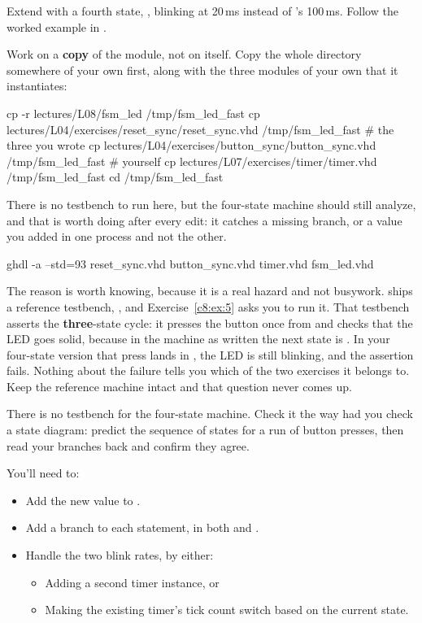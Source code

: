 \label{c8:ex:3}
Extend  with a fourth state, , blinking at 20\,ms instead of
's 100\,ms. Follow the worked example in .

Work on a \textbf{copy} of the module, not on  itself. Copy
the whole directory somewhere of your own first, along with the three modules of your own that it
instantiates:

\begin{shell}
cp -r lectures/L08/fsm_led /tmp/fsm_led_fast
cp lectures/L04/exercises/reset_sync/reset_sync.vhd /tmp/fsm_led_fast     # the three you wrote
cp lectures/L04/exercises/button_sync/button_sync.vhd /tmp/fsm_led_fast   # yourself
cp lectures/L07/exercises/timer/timer.vhd /tmp/fsm_led_fast
cd /tmp/fsm_led_fast
\end{shell}

\noindent There is no testbench to run here, but the four-state machine should still analyze, and
that is worth doing after every edit: it catches a missing  branch, or a 
value you added in one process and not the other.

\begin{shell}
ghdl -a --std=93 reset_sync.vhd button_sync.vhd timer.vhd fsm_led.vhd
\end{shell}

\noindent The reason is worth knowing, because it is a real hazard and not busywork. 
ships a reference testbench, , and Exercise~\ref{c8:ex:5} asks you to run it.
That testbench asserts the \textbf{three}-state cycle: it presses the button once from
 and checks that the LED goes solid, because in the machine as written the next
state is . In your four-state version that press lands in ,
the LED is still blinking, and the assertion fails. Nothing about the failure tells you which of the
two exercises it belongs to. Keep the reference machine intact and that question never comes up.

There is no testbench for the four-state machine. Check it the way  had you check a
state diagram: predict the sequence of states for a run of button presses, then read your
 branches back and confirm they agree.

You'll need to:
\begin{itemize}
  \item Add the new value to .
  \item Add a branch to each  statement, in both  and
    .
  \item Handle the two blink rates, by either:
    \begin{itemize}
      \item Adding a second timer instance, or
      \item Making the existing timer's tick count switch based on the current state.
    \end{itemize}
\end{itemize}

